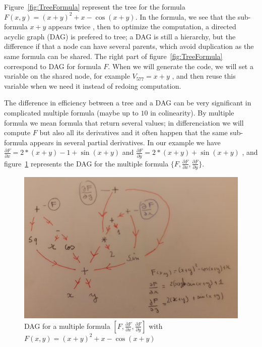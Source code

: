 Figure~\ref{fig:TreeFormula} represent the tree for the formula $F(x,y) = (x+y)^2 +x - \cos(x+y)$. 
In the formula, we see that the sub-formula $x+y$ appears twice , then to optimize the computation,
a directed acyclic graph (DAG) is prefered to tree;  a DAG  is still a hierarchy, but the difference
if that a node can have several parents, which avoid duplication as the same formula can be shared.
The right part of figure~\ref{fig:TreeFormula} correspond to DAG for formula $F$.
When we will generate the code, we will set a variable on the shared node, for example $V_{577} = x+y$ , and then reuse
this variable when we need it instead of redoing computation.


The difference in efficiency between a tree and a DAG can be very significant 
in complicated multiple formula  (maybe up to $10$ in colinearity). By multiple formula we mean formula that return several values;
in differenciation we will compute $F$ but also all its derivatives and it often happen that
the same sub-formula appears in several partial derivatives.  In our example we
have $\frac{\partial F}{\partial x} = 2*(x+y) -1 + \sin(x+y)$ and $\frac{\partial F}{\partial y} = 2*(x+y) + \sin(x+y)$ ,
and figure~\ref{fig:DagMultiformula} represents the DAG for the multiple formula
$\{F,\frac{\partial F}{\partial x},\frac{\partial F}{\partial y}\}$.



\begin{figure}
\centering
\includegraphics[width=12cm]{Programmer/ImagesProg/DAG.jpg}
\caption{DAG for a multiple formula  $[F,\frac{\partial F}{\partial x}, \frac{\partial F}{\partial y}]$ with $F(x,y) = (x+y)^2 +x - \cos(x+y)$}
\label{fig:DagMultiformula}
\end{figure}



